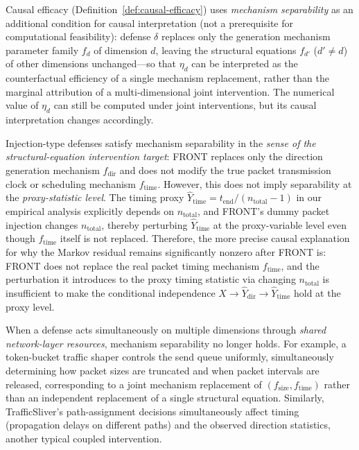 \documentclass[lettersize,journal]{IEEEtran}
\begin{document}
Causal efficacy (Definition~\ref{def:causal-efficacy}) uses
\emph{mechanism separability} as an additional condition for causal
interpretation (not a prerequisite for computational feasibility):
defense $\delta$ replaces only the generation mechanism parameter family
$f_d$ of dimension $d$, leaving the structural equations $f_{d'}$
($d'\neq d$) of other dimensions unchanged---so that $\eta_d$ can be
interpreted as the counterfactual efficiency of a single mechanism
replacement, rather than the marginal attribution of a multi-dimensional
joint intervention.
The numerical value of $\eta_d$ can still be computed under joint
interventions, but its causal interpretation changes accordingly.

Injection-type defenses satisfy mechanism separability in the
\emph{sense of the structural-equation intervention target}:
FRONT replaces only the direction generation mechanism $f_{\mathrm{dir}}$
and does not modify the true packet transmission clock or scheduling
mechanism $f_{\mathrm{time}}$.
However, this does not imply separability at the \emph{proxy-statistic
level}.
The timing proxy $\hat{Y}_{\mathrm{time}} = t_{\mathrm{end}}/(n_{\mathrm{total}}-1)$
in our empirical analysis explicitly depends on $n_{\mathrm{total}}$,
and FRONT's dummy packet injection changes $n_{\mathrm{total}}$, thereby
perturbing $\hat{Y}_{\mathrm{time}}$ at the proxy-variable level even
though $f_{\mathrm{time}}$ itself is not replaced.
Therefore, the more precise causal explanation for why the Markov residual
remains significantly nonzero after FRONT is: FRONT does not replace
the real packet timing mechanism $f_{\mathrm{time}}$, and the perturbation
it introduces to the proxy timing statistic via changing $n_{\mathrm{total}}$
is insufficient to make the conditional independence
$X\to\hat{Y}_{\mathrm{dir}}\to\hat{Y}_{\mathrm{time}}$ hold at the
proxy level.

When a defense acts simultaneously on multiple dimensions through
\emph{shared network-layer resources}, mechanism separability no longer
holds.
For example, a token-bucket traffic shaper controls the send queue
uniformly, simultaneously determining how packet sizes are truncated and
when packet intervals are released, corresponding to a joint mechanism
replacement of $(f_{\mathrm{size}}, f_{\mathrm{time}})$ rather than an
independent replacement of a single structural equation.
Similarly, TrafficSliver's path-assignment decisions simultaneously affect
timing (propagation delays on different paths) and the observed direction
statistics, another typical coupled intervention.
\end{document}

